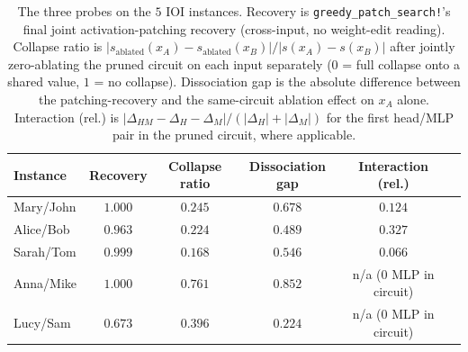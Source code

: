 \documentclass[11pt,a4paper]{article}
\begin{document}
\begin{table}[htbp]
\centering
\small
\begin{tabular}{lccccc}
\toprule
Instance & Recovery & Collapse ratio & Dissociation gap & Interaction (rel.) \\
\midrule
Mary/John  & $1.000$ & $0.245$ & $0.678$ & $0.124$ \\
Alice/Bob  & $0.963$ & $0.224$ & $0.489$ & $0.327$ \\
Sarah/Tom  & $0.999$ & $0.168$ & $0.546$ & $0.066$ \\
Anna/Mike  & $1.000$ & $0.761$ & $0.852$ & n/a (0 MLP in circuit) \\
Lucy/Sam   & $0.673$ & $0.396$ & $0.224$ & n/a (0 MLP in circuit) \\
\bottomrule
\end{tabular}
\caption{The three probes on the $5$ IOI instances. Recovery is
\texttt{greedy\_patch\_search!}'s final joint activation-patching recovery
(cross-input, no weight-edit reading). Collapse ratio is
$|s_{\text{ablated}}(x_A)-s_{\text{ablated}}(x_B)|/|s(x_A)-s(x_B)|$ after
jointly zero-ablating the pruned circuit on each input separately ($0$ =
full collapse onto a shared value, $1$ = no collapse). Dissociation gap is
the absolute difference between the patching-recovery and the same-circuit
ablation effect on $x_A$ alone. Interaction (rel.) is $|\Delta_{HM}-\Delta_H-\Delta_M|/(|\Delta_H|+|\Delta_M|)$
for the first head/MLP pair in the pruned circuit, where applicable.}
\label{tab:qwen}
\end{table}
\end{document}
